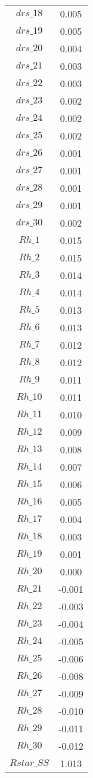\begin{center}
\begin{longtable}{cc}
$drs\_18$ 	 & 	 0.005 \\
$drs\_19$ 	 & 	 0.005 \\
$drs\_20$ 	 & 	 0.004 \\
$drs\_21$ 	 & 	 0.003 \\
$drs\_22$ 	 & 	 0.003 \\
$drs\_23$ 	 & 	 0.002 \\
$drs\_24$ 	 & 	 0.002 \\
$drs\_25$ 	 & 	 0.002 \\
$drs\_26$ 	 & 	 0.001 \\
$drs\_27$ 	 & 	 0.001 \\
$drs\_28$ 	 & 	 0.001 \\
$drs\_29$ 	 & 	 0.001 \\
$drs\_30$ 	 & 	 0.002 \\
$Rh\_1$ 	 & 	 0.015 \\
$Rh\_2$ 	 & 	 0.015 \\
$Rh\_3$ 	 & 	 0.014 \\
$Rh\_4$ 	 & 	 0.014 \\
$Rh\_5$ 	 & 	 0.013 \\
$Rh\_6$ 	 & 	 0.013 \\
$Rh\_7$ 	 & 	 0.012 \\
$Rh\_8$ 	 & 	 0.012 \\
$Rh\_9$ 	 & 	 0.011 \\
$Rh\_10$ 	 & 	 0.011 \\
$Rh\_11$ 	 & 	 0.010 \\
$Rh\_12$ 	 & 	 0.009 \\
$Rh\_13$ 	 & 	 0.008 \\
$Rh\_14$ 	 & 	 0.007 \\
$Rh\_15$ 	 & 	 0.006 \\
$Rh\_16$ 	 & 	 0.005 \\
$Rh\_17$ 	 & 	 0.004 \\
$Rh\_18$ 	 & 	 0.003 \\
$Rh\_19$ 	 & 	 0.001 \\
$Rh\_20$ 	 & 	 0.000 \\
$Rh\_21$ 	 & 	 -0.001 \\
$Rh\_22$ 	 & 	 -0.003 \\
$Rh\_23$ 	 & 	 -0.004 \\
$Rh\_24$ 	 & 	 -0.005 \\
$Rh\_25$ 	 & 	 -0.006 \\
$Rh\_26$ 	 & 	 -0.008 \\
$Rh\_27$ 	 & 	 -0.009 \\
$Rh\_28$ 	 & 	 -0.010 \\
$Rh\_29$ 	 & 	 -0.011 \\
$Rh\_30$ 	 & 	 -0.012 \\
$Rstar\_SS$ 	 & 	 1.013 \\
\bottomrule%
\end{longtable}
\end{center}
